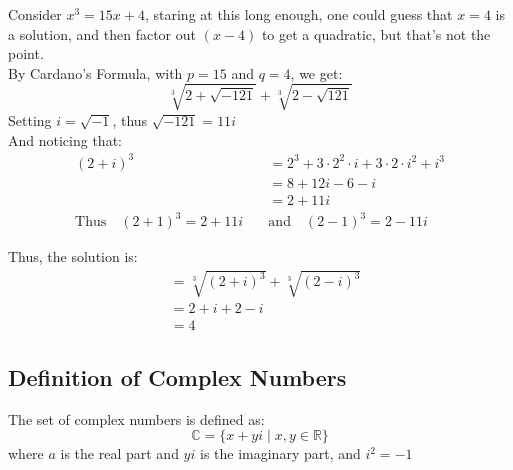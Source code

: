 \documentclass[12pt]{article}
\theoremstyle{definition}
\theoremstyle{plain}
\begin{document}
\begin{examplebox}
Consider $x^3 = 15x +4$, staring at this long enough, one could guess that $x=4$ is a solution, and then factor out $(x-4)$ to get a quadratic, but that's not the point.\\
By Cardano's Formula, with $p = 15$ and $q = 4$, we get:
$$\sqrt[3]{2 + \sqrt{-121}} + \sqrt[3]{2-\sqrt{121}}$$
Setting $i = \sqrt{-1}$, thus $\sqrt{-121} = 11i$ \\
And noticing that:
\begin{align*}
  (2+i)^3 &= 2^3 + 3\cdot2^2 \cdot i + 3\cdot 2 \cdot i^2 + i^3 \\
  &= 8 + 12i - 6 - i \\ 
  &= 2 + 11i \\ 
  \text{Thus} \quad (2+1)^3 = 2 + 11i \quad &\text{and} \quad (2-1)^3 = 2 - 11i
\end{align*}

Thus, the solution is:
\begin{align*}
  &= \sqrt[3]{(2+i)^3} + \sqrt[3]{(2-i)^3} \\ 
  &= 2+ i + 2 - i \\
  &= 4
\end{align*}
\end{examplebox}
\pagebreak
\subsection{Definition of Complex Numbers}

\begin{definitionbox}
  The set of complex numbers is defined as: 
  $$\mathbb{C} = \{x + yi \mid x,y \in \mathbb{R}\}$$
  where $a$ is the real part and $yi$ is the imaginary part, and $i^2 = -1$
\end{definitionbox}
\end{document}
